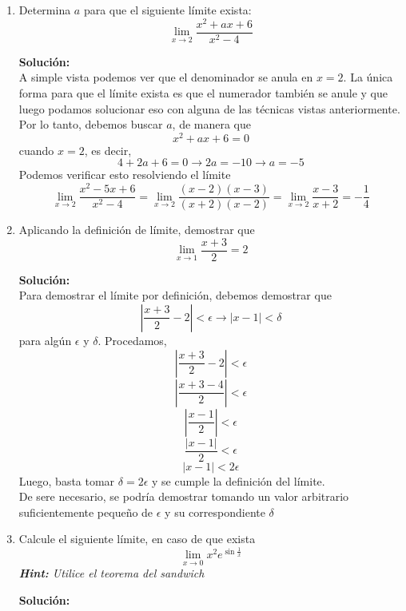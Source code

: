 \documentclass[12pt]{article}
\newenvironment{solucion}
{\begin{mdframed}[backgroundcolor=black!10]
		{\bf Solución:}\\
	}
	{
	\end{mdframed}
}
\newenvironment{preguntas}
{\begin{enumerate}\itemsep12pt
	}
	{
	\end{enumerate}
}
\newcommand{\ra}{\rightarrow}
\begin{document}
\begin{preguntas}
\begin{solucion}
\begin{enumerate}[a)]
\[\begin{array}{rrrrrr}
& 1 & 3& 0 & 4 & 0
\end{array}
\]
por lo que $x^4+2x^3-3x^2+4x-4 : x-1 = x^3+3x^2+4$\\
Luego, $x^4+2x-3 : x-1$, esto es,
\[
\renewcommand\arraystretch{1.5}
\setlength\doublerulesep{0pt}
\begin{array}{rrrrrr}
\multicolumn{1}{r|}{1} & 1 & 0 & 0 & 2 & -3\\\cline{2-6}
& & 1& 1 & 1 & 3\\\cline{2-6}
& 1 & 1& 1 & 3 & 0
\end{array}
\]
por lo que $x^4+2x-3 : x-1 = x^3+x^2+x+3$
Entonces, podemos escribir el límite como
$$\lim\limits_{x \ra 1} \dfrac{(x^3+3x^2+4)(x-1)}{(x^3+x^2+x+3)(x-1)}
= \lim\limits_{x \ra 1} \dfrac{(x^3+3x^2+4)}{(x^3+x^2+x+3)}
= \dfrac{8}{6} = \dfrac{4}{3}$$
\item 
\item 
\end{enumerate}
\end{solucion}
\item Determina $a$ para que el siguiente límite exista:
$$ \lim\limits_{x \ra 2} \dfrac{x^2+ax+6}{x^2-4} $$
\begin{solucion}
A simple vista podemos ver que el denominador se anula en $x=2$. La única forma para que el límite exista es que el numerador también se anule y que luego podamos solucionar eso con alguna de las técnicas vistas anteriormente.\\
Por lo tanto, debemos buscar $a$, de manera que
$$x^2+ax+6 = 0$$
cuando $x=2$, es decir,
$$4+2a+6 = 0 \ra 2a = -10 \ra a = -5$$
Podemos verificar esto resolviendo el límite
$$ \lim\limits_{x \ra 2} \dfrac{x^2-5x+6}{x^2-4}
= \lim\limits_{x \ra 2} \dfrac{(x-2)(x-3)}{(x+2)(x-2)}
= \lim\limits_{x \ra 2} \dfrac{x-3}{x+2}
= -\dfrac{1}{4} $$
\end{solucion}
\item Aplicando la definición de límite, demostrar que
$$\lim\limits_{x \ra 1} \dfrac{x+3}{2} = 2$$
\begin{solucion}
Para demostrar el límite por definición, debemos demostrar que
$$\left| \dfrac{x+3}{2} - 2 \right| < \epsilon \ra |x-1| < \delta$$
para algún $\epsilon$ y $\delta$. Procedamos,
$$\left| \dfrac{x+3}{2} - 2 \right| < \epsilon$$
$$\left| \dfrac{x+3-4}{2} \right| < \epsilon$$
$$\left| \dfrac{x-1}{2} \right| < \epsilon$$
$$ \dfrac{|x-1|}{2} < \epsilon$$
$$ |x-1| < 2\epsilon$$
Luego, basta tomar $\delta = 2 \epsilon$ y se cumple la definición del límite. \\
De sere necesario, se podría demostrar tomando un valor arbitrario suficientemente pequeño de $\epsilon$ y su correspondiente $\delta$
\end{solucion}
\item Calcule el siguiente límite, en caso de que exista
$$ \lim\limits_{x \ra 0} x^2e^{\sin{\frac{1}{x}}} $$
\textit{\textbf{Hint:} Utilice el teorema del sandwich}
\begin{solucion}

\end{solucion}
\end{preguntas}
\end{document}
